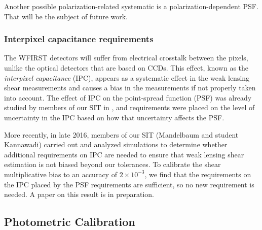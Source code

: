 Another possible polarization-related systematic is a polarization-dependent PSF.  That will be the
subject of future work.

\subsubsection{Interpixel capacitance requirements}

The WFIRST detectors will suffer from electrical crosstalk between the pixels, unlike the optical
 detectors that are based on CCDs. This effect, known as the \emph{interpixel capacitance} (IPC),
 appears as a systematic effect in the weak lensing shear measurements and causes a 
 bias in the measurements if not properly taken into account. The effect of IPC on the point-spread
 function (PSF) was already studied by members of our SIT in \cite{Kannawadi2016}, and requirements were placed
 on the level of uncertainty in the IPC based on how that uncertainty affects the PSF. 

More recently, in late 2016, members of our SIT (Mandelbaum and student Kannawadi) carried out and
analyzed simulations to determine whether additional requirements on IPC are needed to ensure that
weak lensing shear estimation is not biased beyond our tolerances.  To calibrate the shear
multiplicative bias to an accuracy of $2\times 10^{-3}$, we find that the requirements on the IPC
placed by the PSF requirements are sufficient, so no new requirement is needed.  A paper on this
result is in preparation.


\subsection{Photometric Calibration}
\label{sec:wl_calibration}

